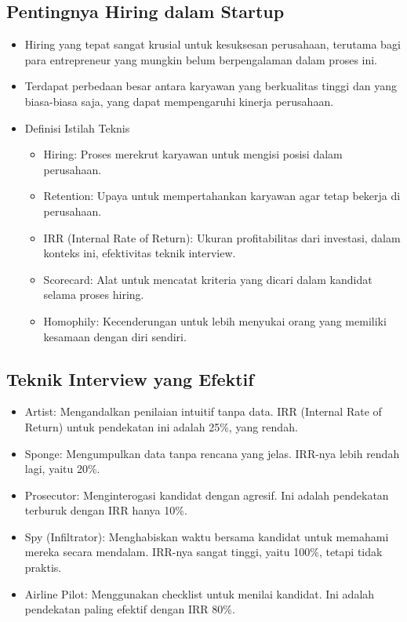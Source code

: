 \documentclass{article}
\begin{document}
\subsection{Pentingnya Hiring dalam Startup}
\begin{itemize}
    \item Hiring yang tepat sangat krusial untuk kesuksesan perusahaan, terutama bagi para entrepreneur yang mungkin belum berpengalaman dalam proses ini.
    \item Terdapat perbedaan besar antara karyawan yang berkualitas tinggi dan yang biasa-biasa saja, yang dapat mempengaruhi kinerja perusahaan.
    \item Definisi Istilah Teknis
          \begin{itemize}
              \item Hiring: Proses merekrut karyawan untuk mengisi posisi dalam perusahaan.
              \item Retention: Upaya untuk mempertahankan karyawan agar tetap bekerja di perusahaan.
              \item IRR (Internal Rate of Return): Ukuran profitabilitas dari investasi, dalam konteks ini, efektivitas teknik interview.
              \item Scorecard: Alat untuk mencatat kriteria yang dicari dalam kandidat selama proses hiring.
              \item Homophily: Kecenderungan untuk lebih menyukai orang yang memiliki kesamaan dengan diri sendiri.
          \end{itemize}
\end{itemize}

\subsection{Teknik Interview yang Efektif}
\begin{itemize}
    \item Artist: Mengandalkan penilaian intuitif tanpa data. IRR (Internal Rate of Return) untuk pendekatan ini adalah 25\%, yang rendah.
    \item Sponge: Mengumpulkan data tanpa rencana yang jelas. IRR-nya lebih rendah lagi, yaitu 20\%.
    \item Prosecutor: Menginterogasi kandidat dengan agresif. Ini adalah pendekatan terburuk dengan IRR hanya 10\%.
    \item Spy (Infiltrator): Menghabiskan waktu bersama kandidat untuk memahami mereka secara mendalam. IRR-nya sangat tinggi, yaitu 100\%, tetapi tidak praktis.
    \item Airline Pilot: Menggunakan checklist untuk menilai kandidat. Ini adalah pendekatan paling efektif dengan IRR 80\%.
\end{itemize}
\end{document}
